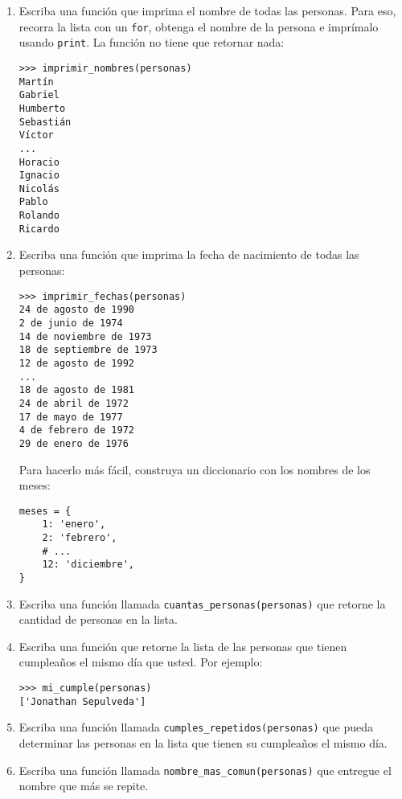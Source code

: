 \begin{enumerate}
\item
  Escriba una función que imprima el nombre de todas las personas. Para
  eso, recorra la lista con un \lstinline!for!, obtenga el nombre de la
  persona e imprímalo usando \lstinline!print!. La función no tiene que
  retornar nada:

\begin{lstlisting}
>>> imprimir_nombres(personas)
Martín
Gabriel
Humberto
Sebastián
Víctor
...
Horacio
Ignacio
Nicolás
Pablo
Rolando
Ricardo
\end{lstlisting}
\item
  Escriba una función que imprima la fecha de nacimiento de todas las
  personas:

\begin{lstlisting}
>>> imprimir_fechas(personas)
24 de agosto de 1990
2 de junio de 1974
14 de noviembre de 1973
18 de septiembre de 1973
12 de agosto de 1992
...
18 de agosto de 1981
24 de abril de 1972
17 de mayo de 1977
4 de febrero de 1972
29 de enero de 1976
\end{lstlisting}

  Para hacerlo más fácil, construya un diccionario con los nombres de
  los meses:

\begin{lstlisting}
meses = {
    1: 'enero',
    2: 'febrero',
    # ...
    12: 'diciembre',
}
\end{lstlisting}
\item
  Escriba una función llamada \lstinline!cuantas_personas(personas)! que
  retorne la cantidad de personas en la lista.
\item
  Escriba una función que retorne la lista de las personas que tienen
  cumpleaños el mismo día que usted. Por ejemplo:

\begin{lstlisting}
>>> mi_cumple(personas)
['Jonathan Sepulveda']
\end{lstlisting}
\item
  Escriba una función llamada \lstinline!cumples_repetidos(personas)!
  que pueda determinar las personas en la lista que tienen su cumpleaños
  el mismo día.
\item
  Escriba una función llamada \lstinline!nombre_mas_comun(personas)! que
  entregue el nombre que más se repite.
\end{enumerate}
